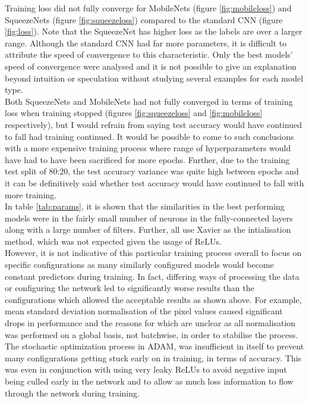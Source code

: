 \documentclass{article}
\begin{document}
{Training loss did not fully converge for MobileNets (figure \ref{fig:mobileloss}) and SqueezeNets (figure \ref{fig:squeezeloss}) compared to the standard CNN (figure \ref{fig:loss}). Note that the SqueezeNet has higher loss as the labels are over a larger range. Although the standard CNN had far more parameters, it is difficult to attribute the speed of convergence to this characteristic. Only the best models' speed of convergence were analysed and it is not possible to give an explanation beyond intuition or speculation without studying several examples for each model type. \\

Both SqueezeNets and MobileNets had not fully converged in terms of training loss when training stopped (figures \ref{fig:squeezeloss} and \ref{fig:mobileloss} respectively), but I would refrain from saying test accuracy would have continued to fall had training continued. It would be possible to come to such conclusions with a more expensive training process where range of hyperparameters would have had to have been sacrificed for more epochs. Further, due to the training test split of 80:20, the test accuracy variance was quite high between epochs and it can be definitively said whether test accuracy would have continued to fall with more training.\\

In table \ref{tab:params}, it is shown that the similarities in the best performing models were in the fairly small number of neurons in the fully-connected layers along with a large number of filters. Further, all use Xavier as the intialisation method, which was not expected given the usage of ReLUs.\\

However, it is not indicative of this particular training process overall to focus on specific configurations as many similarly configured models would become constant predictors during training. In fact, differing ways of processing the data or configuring the network led to significantly worse results than the configurations which allowed the acceptable results as shown above. For example, mean standard deviation normalisation of the pixel values caused significant drops in performance and the reasons for which are unclear as all normalisation was performed on a global basis, not batchwise, in order to stabilise the process. \\

The stochastic optimization process in ADAM, was insufficient in itself to prevent many configurations getting stuck early on in training, in terms of accuracy. This was even in conjunction with using very leaky ReLUs to avoid negative input being culled early in the network and to allow as much loss information to flow through the network during training.\\

}
\end{document}
